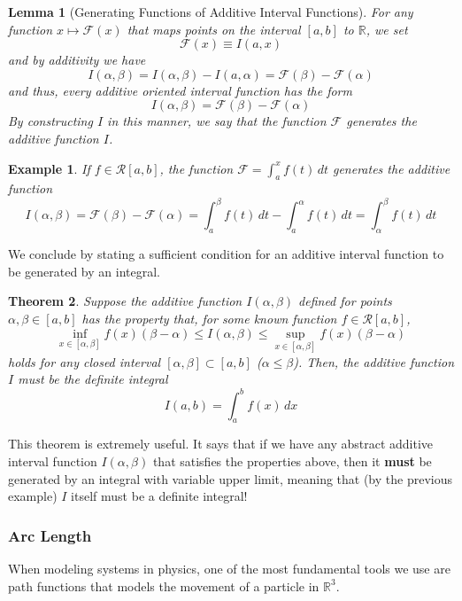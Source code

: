 \documentclass{article}
\newtheorem{theorem}{Theorem}[section]
\newtheorem{lemma}[theorem]{Lemma}
\newtheorem{example}{Example}[section]
\theoremstyle{remark}
\theoremstyle{definition}
\begin{document}
\begin{lemma}[Generating Functions of Additive Interval Functions]
For any function $x \mapsto \mathcal{F}(x)$ that maps points on the interval $[a, b]$ to $\mathbb{R}$, we set
\[\mathcal{F}(x) \equiv I(a, x)\]
and by additivity we have
\[I(\alpha, \beta) = I(\alpha, \beta) - I(a, \alpha) = \mathcal{F}(\beta) - \mathcal{F}(\alpha)\]
and thus, every additive oriented interval function has the form 
\[I(\alpha, \beta) = \mathcal{F}(\beta) - \mathcal{F}(\alpha)\]
By constructing $I$ in this manner, we say that \textit{the function $\mathcal{F}$ generates the additive function $I$}. 
\end{lemma}

\begin{example}
If $f \in \mathcal{R}[a, b]$, the function $\mathcal{F} = \int_a^x f(t)\,dt$ generates the additive function
\[I(\alpha, \beta) = \mathcal{F}(\beta) - \mathcal{F}(\alpha) = \int_a^\beta f(t)\,dt - \int_a^\alpha f(t)\,dt = \int_\alpha^\beta f(t)\,dt\]
\end{example}

We conclude by stating a sufficient condition for an additive interval function to be generated by an integral. 
\begin{theorem}
Suppose the additive function $I(\alpha, \beta)$ defined for points $\alpha, \beta \in [a, b]$ has the property that, for some known function $f \in \mathcal{R}[a, b]$, 
\[\inf_{x \in [\alpha, \beta]} f(x) (\beta - \alpha) \leq I(\alpha, \beta) \leq \sup_{x \in [\alpha, \beta]} f(x) (\beta - \alpha)\]
holds for any closed interval $[\alpha, \beta] \subset [a, b]$ ($\alpha \leq \beta$). Then, the additive function $I$ must be the definite integral
\[I(a, b) = \int_a^b f(x)\,dx\]
\end{theorem}

This theorem is extremely useful. It says that if we have any abstract additive interval function $I(\alpha, \beta)$ that satisfies the properties above, then it \textbf{must} be generated by an integral with variable upper limit, meaning that (by the previous example) $I$ itself must be a definite integral! 

\subsubsection{Arc Length}
When modeling systems in physics, one of the most fundamental tools we use are path functions that models the movement of a particle in $\mathbb{R}^3$. 
\end{document}
